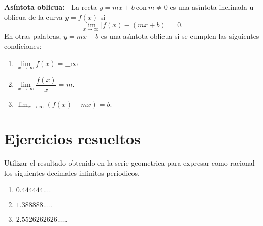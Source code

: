 \begin{definition}
{\bf As\'intota oblicua:\ }%
%
La recta $y=mx+b\ $con$\ m\neq0$ es una as\'{\i}ntota inclinada u oblicua de
la curva $y=f(x)$ si
\[
\lim_{x\rightarrow\infty}\left\vert f(x)-(mx+b)\right\vert =0.
\]
En otras palabras, $y=mx+b$ es una as\'{\i}ntota oblicua si se cumplen las
siguientes condiciones:
\begin{enumerate}
\item $\lim\limits_{x\rightarrow\infty}f(x)=\pm\infty$
\item $\lim\limits_{x\rightarrow\infty}\dfrac{f(x)}{x}=m.$
\item $\lim_{x\rightarrow\infty}\left(  f(x)-mx\right)  =b.$
\end{enumerate}
\end{definition}

\section{Ejercicios resueltos}

\begin{example}
Utilizar el resultado obtenido en la serie geometrica para expresar como
racional los siguientes decimales infinitos periodicos.

\begin{enumerate}
\item $0.444444....$

\item $1.388888.....$

\item $2.5526262626.....$
\end{enumerate}
\end{example}

